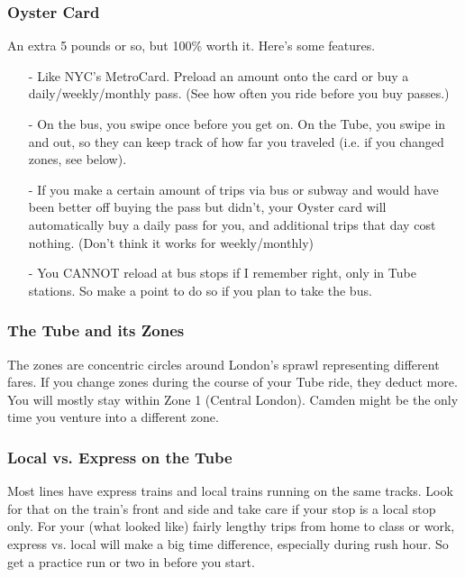 \documentclass[a4paper,12pt]{scrartcl}
\begin{document}
\subsubsection{Oyster Card}  An extra 5 pounds or so, but 100\% worth it.
   Here's some features.
   \begin{itemize}
      \item[-] Like NYC's MetroCard. Preload an amount onto the card or
	  buy a daily/weekly/monthly pass. (See how often you ride
	  before you buy passes.) 
       \item[-] On the bus, you swipe once before you get on. On the
	  Tube, you swipe in and out, so they can keep track of
	  how far you traveled (i.e. if you changed zones, see below).
       \item[-] If you make a certain amount of trips via bus or subway 
	  and  would have been better off buying the pass but didn't, 
	  your Oyster card will automatically buy a daily pass for you, 
	  and additional trips that day cost nothing.  
	  (Don't think it works for weekly/monthly)
       \item[-] You CANNOT reload at bus stops if I remember right, 
	  only in Tube stations. So make a point to do so if you 
	  plan to take the bus.

   \end{itemize}

\subsubsection{The Tube and its Zones} 
The zones are concentric circles around London's sprawl representing 
different fares. If you change zones during the course of your 
Tube ride, they deduct more.
You will mostly stay within Zone 1 (Central London). Camden might
be the only time you venture into a different zone.


\subsubsection{Local vs. Express on the Tube}
Most lines have express trains and local trains running on 
the same tracks.  Look for that on the train's front and side and
take care if your stop is a local stop only. 
For your (what looked like) fairly lengthy trips from home to class or
work,
express vs. local will make a big time difference, especially during 
rush hour. So get a practice run or two in before you start.
\end{document}
